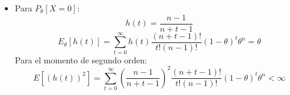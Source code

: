 \begin{ejercicio}
\begin{enumerate}[label=\alph*)]
            \begin{itemize}
                \item Para $P_\theta[X=0]$:
                    \begin{equation*}
                        h(t) = \dfrac{n-1}{n+t-1}
                    \end{equation*}
                    \begin{equation*}
                        E_\theta[h(t)] = \sum_{t=0}^{\infty}h(t)\dfrac{(n+t-1)!}{t!(n-1)!}{(1-\theta)}^{t}\theta^n = \theta
                    \end{equation*}
                    Para el momento de segundo orden:
                    \begin{equation*}
                        E[{(h(t))}^{2}] = \sum_{t=0}^{\infty} {\left(\dfrac{n-1}{n+t-1}\right)}^{2} \dfrac{(n+t-1)!}{t!(n-1)!}{(1-\theta)}^{t}\theta^n < \infty

\end{equation*}
\end{itemize}
\end{enumerate}
\end{ejercicio}

